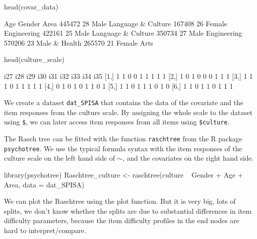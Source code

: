 \documentclass[doc,floatsintext,natbib]{apa7}
\begin{document}
\begin{Schunk}
\begin{Sinput}
 head(covar_data)
\end{Sinput}
\begin{Soutput}
       Age Gender                Area
445472  28   Male  Language & Culture
167408  26 Female         Engineering
422161  25   Male  Language & Culture
350734  27   Male         Engineering
570206  23   Male \nMedicine & Health
265570  21 Female                Arts
\end{Soutput}
\begin{Sinput}
 head(culture_scale)
\end{Sinput}
\begin{Soutput}
     i27 i28 i29 i30 i31 i32 i33 i34 i35
[1,]   1   1   0   0   1   1   1   1   1
[2,]   1   0   1   0   0   0   1   1   1
[3,]   1   1   1   0   1   1   1   1   1
[4,]   0   1   0   1   0   1   1   0   1
[5,]   1   1   0   1   1   1   0   1   0
[6,]   1   1   0   1   1   0   1   1   1
\end{Soutput}
\end{Schunk}

We create a dataset \texttt{dat\_SPISA} that contains the data of the covariate and the item responses from the culture scale. By assigning the whole scale to the dataset using \texttt{\$}, we can later access item responses from all items using \texttt{\$culture}. 
\begin{Schunk}
\end{Schunk}

The Rasch tree can be fitted with the function \texttt{raschtree} from the R package \texttt{psychotree}. We use the typical formula syntax with the item responses of the culture scale on the left hand side of $\sim$, and the covariates on the right hand side. 



\begin{Schunk}
\begin{Sinput}
 library(psychotree)
 Raschtree_culture <- raschtree(culture ~  Gender + Age + Area,
                                data = dat_SPISA)
\end{Sinput}
\end{Schunk}

We can plot the Raschtree using the plot function. But it is very big, lots of splits, we don't know whether the splits are due to substantial differences in item difficulty parameters, because the item difficulty profiles in the end nodes are hard to interpret/compare. 
\end{document}
